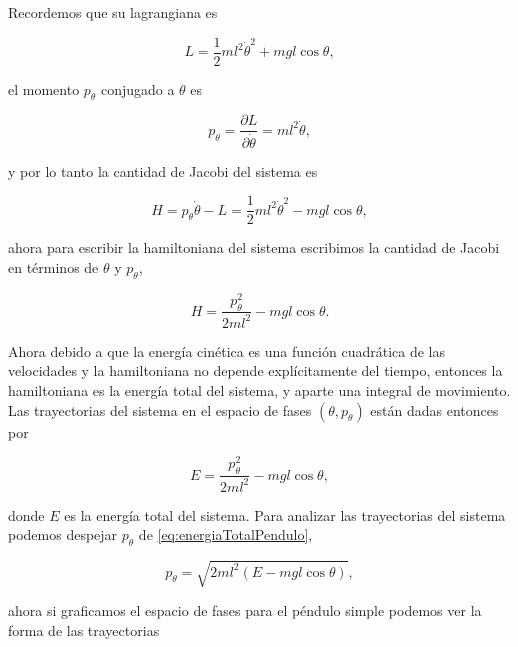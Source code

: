 \documentclass[a4paper,10pt]{article}
\numberwithin{equation}{section}
\begin{document}
Recordemos que su lagrangiana es 

\begin{equation}
 L = \frac{1}{2}ml^2\dot{\theta}^2 + mgl\cos{\theta},
\end{equation}

el momento $p_\theta$ conjugado a $\theta$ es 

\begin{equation}
 p_\theta = \frac{\partial L}{\partial \dot{\theta}} = ml^2\dot{\theta},
\end{equation}

y por lo tanto la cantidad de Jacobi del sistema es 

\begin{equation}
 H = p_\theta \dot{\theta} - L = \frac{1}{2}ml^2\dot{\theta}^2 - mgl\cos{\theta},
\end{equation}

ahora para escribir la hamiltoniana del sistema escribimos la cantidad de Jacobi 
en términos de $\theta$ y $p_\theta$, 

\begin{equation}
 H = \frac{p_\theta^2}{2ml^2} - mgl\cos{\theta}.
\end{equation}

Ahora debido a que la energía cinética es una función cuadrática de las velocidades 
y la hamiltoniana no depende explícitamente del tiempo, entonces la hamiltoniana es 
la energía total del sistema, y aparte una integral de movimiento. Las trayectorias 
del sistema en el espacio de fases $(\theta,p_\theta)$ están dadas entonces por 

\begin{equation}
 E = \frac{p_\theta^2}{2ml^2} - mgl\cos{\theta},
 \label{eq:energiaTotalPendulo}
\end{equation}

donde $E$ es la energía total del sistema. Para analizar las trayectorias del sistema 
podemos despejar $p_\theta$ de \eqref{eq:energiaTotalPendulo}, 

\begin{equation}
 p_\theta = \sqrt{2ml^2(E - mgl\cos{\theta})},
\end{equation}

ahora si graficamos el espacio de fases para el péndulo simple podemos ver la 
forma de las trayectorias 
\end{document}
